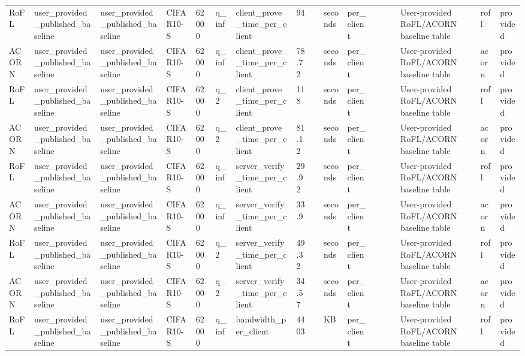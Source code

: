 \begin{table}[t]
\begin{tabular}{lllllllllllllllll}
RoFL & user\_provided\_published\_baseline & user\_provided\_published\_baseline & CIFAR10-S & 62000 & q\_inf & client\_prove\_time\_per\_client & 94 &  & seconds & per\_client &  &  &  & User-provided RoFL/ACORN baseline table & rofl & provided \\
ACORN & user\_provided\_published\_baseline & user\_provided\_published\_baseline & CIFAR10-S & 62000 & q\_inf & client\_prove\_time\_per\_client & 78.72 &  & seconds & per\_client &  &  &  & User-provided RoFL/ACORN baseline table & acorn & provided \\
RoFL & user\_provided\_published\_baseline & user\_provided\_published\_baseline & CIFAR10-S & 62000 & q\_2 & client\_prove\_time\_per\_client & 118 &  & seconds & per\_client &  &  &  & User-provided RoFL/ACORN baseline table & rofl & provided \\
ACORN & user\_provided\_published\_baseline & user\_provided\_published\_baseline & CIFAR10-S & 62000 & q\_2 & client\_prove\_time\_per\_client & 81.12 &  & seconds & per\_client &  &  &  & User-provided RoFL/ACORN baseline table & acorn & provided \\
RoFL & user\_provided\_published\_baseline & user\_provided\_published\_baseline & CIFAR10-S & 62000 & q\_inf & server\_verify\_time\_per\_client & 29.92 &  & seconds & per\_client &  &  &  & User-provided RoFL/ACORN baseline table & rofl & provided \\
ACORN & user\_provided\_published\_baseline & user\_provided\_published\_baseline & CIFAR10-S & 62000 & q\_inf & server\_verify\_time\_per\_client & 33.9 &  & seconds & per\_client &  &  &  & User-provided RoFL/ACORN baseline table & acorn & provided \\
RoFL & user\_provided\_published\_baseline & user\_provided\_published\_baseline & CIFAR10-S & 62000 & q\_2 & server\_verify\_time\_per\_client & 49.32 &  & seconds & per\_client &  &  &  & User-provided RoFL/ACORN baseline table & rofl & provided \\
ACORN & user\_provided\_published\_baseline & user\_provided\_published\_baseline & CIFAR10-S & 62000 & q\_2 & server\_verify\_time\_per\_client & 34.57 &  & seconds & per\_client &  &  &  & User-provided RoFL/ACORN baseline table & acorn & provided \\
RoFL & user\_provided\_published\_baseline & user\_provided\_published\_baseline & CIFAR10-S & 62000 & q\_inf & bandwidth\_per\_client & 4403 &  & KB & per\_client &  &  &  & User-provided RoFL/ACORN baseline table & rofl & provided \\

\end{tabular}
\end{table}
